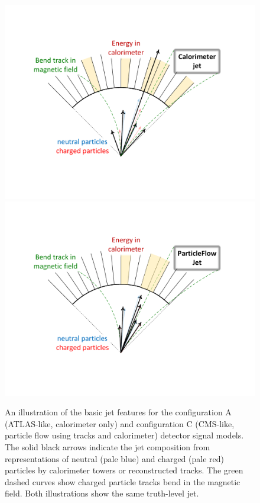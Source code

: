\documentclass[11pt,letterpaper]{article}
\newcommand{\GeV}{\text{GeV}}
\newcommand{\ccalo}{\ensuremath{c_{\text{calo}}}}
\newcommand{\atrk}{\ensuremath{a_{\text{track}}}}
\newcommand{\ctrk}{\ensuremath{c_{\text{track}}}}
\begin{document}



\begin{figure}
\begin{center}
\includegraphics[width=0.48\columnwidth]{figures/jets_in_atlas}\quad
\includegraphics[width=0.48\columnwidth]{figures/jets_in_cms}
\end{center}
\caption{An illustration of the basic jet features for the configuration A (ATLAS-like, calorimeter only) and configuration C (CMS-like, particle flow using tracks and calorimeter) detector signal models. The solid black arrows indicate the jet composition from representations of neutral (pale blue) and charged (pale red) particles by calorimeter towers or reconstructed tracks. The green dashed curves show charged particle tracks bend in the magnetic field. Both illustrations show the same truth-level jet.}
\label{fig:detmodel}
\end{figure}
\end{document}
